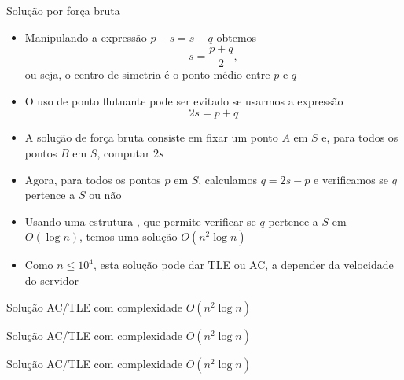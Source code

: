 \begin{frame}[fragile]{Solução por força bruta}

    \begin{itemize}
        \item Manipulando a expressão $p - s = s - q$ obtemos
        \[
            s = \frac{p + q}{2},
        \]
        ou seja, o centro de simetria é o ponto médio entre $p$ e $q$
        \pause

        \item O uso de ponto flutuante pode ser evitado se usarmos a expressão
        \[
            2s = p + q
        \]
        \pause
        \item A solução de força bruta consiste em fixar um ponto $A$ em $S$ e, para todos os
        pontos $B$ em $S$, computar $2s$ 
        \pause

        \item Agora, para todos os pontos $p$ em $S$, calculamos $q = 2s - p$ e verificamos se
            $q$ pertence a $S$ ou não
        \pause

        \item Usando uma estrutura , que permite verificar se $q$ pertence a $S$ em
            $O(\log n)$, temos uma solução $O(n^2\log n)$
        \pause

        \item Como $n\leq 10^4$, esta solução pode dar TLE ou AC, a depender da velocidade do
            servidor
    \end{itemize}

\end{frame}

\begin{frame}[fragile]{Solução AC/TLE com complexidade $O(n^2\log n)$}
\end{frame}

\begin{frame}[fragile]{Solução AC/TLE com complexidade $O(n^2\log n)$}
\end{frame}

\begin{frame}[fragile]{Solução AC/TLE com complexidade $O(n^2\log n)$}
\end{frame}

